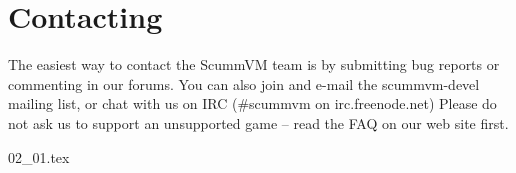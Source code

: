 


\section{Contacting}

The easiest way to contact the ScummVM team is by submitting bug reports or
commenting in our forums. You can also join and e-mail the scummvm-devel
mailing list, or chat with us on IRC (\#scummvm on irc.freenode.net)
Please do not ask us to support an unsupported game -- read the FAQ on our
web site first.

 {02_01.tex}
